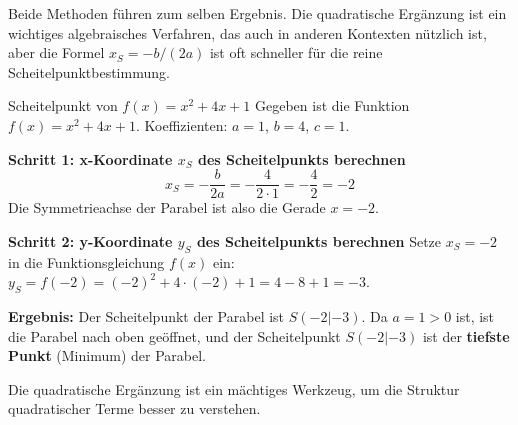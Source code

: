Beide Methoden führen zum selben Ergebnis. Die quadratische Ergänzung ist ein wichtiges algebraisches Verfahren, das auch in anderen Kontexten nützlich ist, aber die Formel $x_S = -b/(2a)$ ist oft schneller für die reine Scheitelpunktbestimmung.

\begin{beispielumgebung}[Scheitelpunkt mit Formel $x_S = -b/(2a)$]{Scheitelpunkt von $f(x) = x^2 + 4x + 1$}
Gegeben ist die Funktion $f(x) = x^2 + 4x + 1$.
Koeffizienten: $a=1$, $b=4$, $c=1$.

\textbf{Schritt 1: x-Koordinate $x_S$ des Scheitelpunkts berechnen}
\[ x_S = -\frac{b}{2a} = -\frac{4}{2 \cdot 1} = -\frac{4}{2} = -2 \]
Die Symmetrieachse der Parabel ist also die Gerade $x = -2$.

\textbf{Schritt 2: y-Koordinate $y_S$ des Scheitelpunkts berechnen}
Setze $x_S = -2$ in die Funktionsgleichung $f(x)$ ein:
$y_S = f(-2) = (-2)^2 + 4 \cdot (-2) + 1 = 4 - 8 + 1 = -3$.

\textbf{Ergebnis:} Der Scheitelpunkt der Parabel ist $S(-2|-3)$.
Da $a=1 > 0$ ist, ist die Parabel nach oben geöffnet, und der Scheitelpunkt $S(-2|-3)$ ist der \textbf{tiefste Punkt} (Minimum) der Parabel.
\end{beispielumgebung}

Die quadratische Ergänzung ist ein mächtiges Werkzeug, um die Struktur quadratischer Terme besser zu verstehen.

